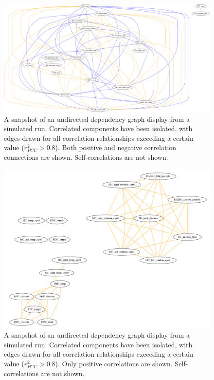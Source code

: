 \begin{figure}[h]
\centering
    \includegraphics[width=\columnwidth]{images/undirected_both.png}
    \caption{A snapshot of an undirected dependency graph display from a simulated run. Correlated components have been isolated, with edges drawn for all correlation relationships exceeding a certain value ($r_{PCC}^{2} > 0.8$). Both positive and negative correlation connections are shown. Self-correlations are not shown.}
    \label{fig:undirected_both}
\end{figure}

\begin{figure}[h]
\centering
    \includegraphics[width=\columnwidth]{images/undirected_positive_only.png}
    \caption{A snapshot of an undirected dependency graph display from a simulated run. Correlated components have been isolated, with edges drawn for all correlation relationships exceeding a certain value ($r_{PCC}^{2} > 0.8$). Only positive correlations are shown. Self-correlations are not shown.}
    \label{fig:undirected_positive_only}
\end{figure}

